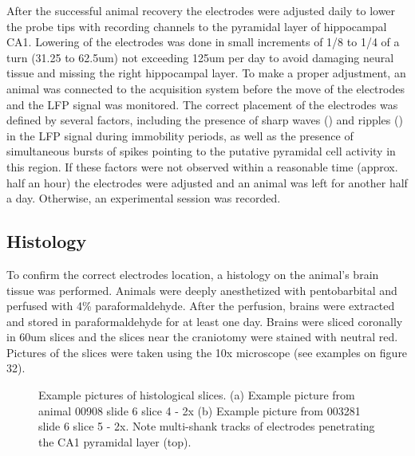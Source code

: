 After the successful animal recovery the electrodes were adjusted daily to lower the probe tips with recording channels to the pyramidal layer of hippocampal CA1. Lowering of the electrodes was done in small increments of 1/8 to 1/4 of a turn (31.25 to 62.5um) not exceeding 125um per day to avoid damaging neural tissue and missing the right hippocampal layer. To make a proper adjustment, an animal was connected to the acquisition system before the move of the electrodes and the LFP signal was monitored. The correct placement of the electrodes was defined by several factors, including the presence of sharp waves (\cite{Buzsaki1986}) and ripples (\cite{OKeefe1978}) in the LFP signal during immobility periods, as well as the presence of simultaneous bursts of spikes pointing to the putative pyramidal cell activity in this region. If these factors were not observed within a reasonable time (approx. half an hour) the electrodes were adjusted and an animal was left for another half a day. Otherwise, an experimental session was recorded.


\subsection{Histology}

To confirm the correct electrodes location, a histology on the animal’s brain tissue was performed. Animals were deeply anesthetized with pentobarbital and perfused with 4\% paraformaldehyde. After the perfusion, brains were extracted and stored in paraformaldehyde for at least one day. Brains were sliced coronally in 60um slices and the slices near the craniotomy were stained with neutral red. Pictures of the slices were taken using the 10x microscope (see examples on figure 32).

\begin{figure}
\captionsetup{format=plain}
\caption[Histology]{
Example pictures of histological slices. (a) Example picture from animal 00908 slide 6 slice 4 - 2x (b) Example picture from 003281 slide 6 slice 5 - 2x. Note multi-shank tracks of electrodes penetrating the CA1 pyramidal layer (top).
}
\label{fig:F32_histology}
\end{figure}


